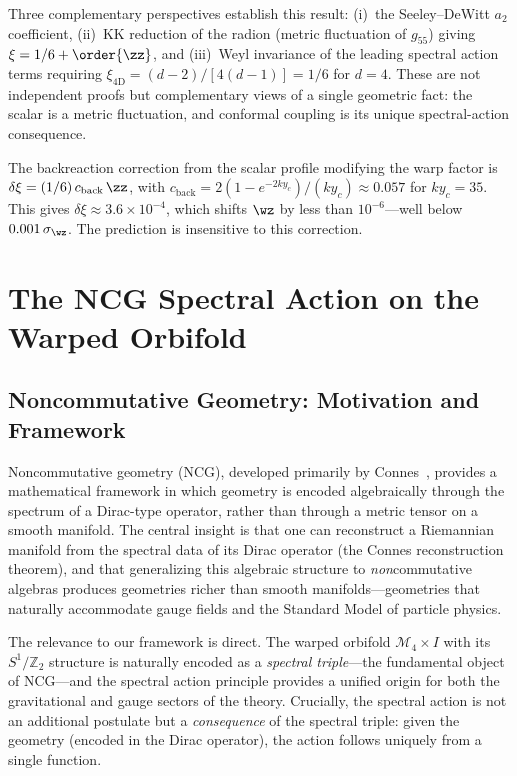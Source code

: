 Three complementary perspectives establish this result: (i)~the Seeley--DeWitt $a_2$ coefficient, (ii)~KK reduction of the radion (metric fluctuation of $g_{55}$) giving $\xi = 1/6 + \order{\zz}$, and (iii)~Weyl invariance of the leading spectral action terms requiring $\xi_{4\mathrm{D}} = (d-2)/[4(d-1)] = 1/6$ for $d = 4$. These are not independent proofs but complementary views of a single geometric fact: the scalar is a metric fluctuation, and conformal coupling is its unique spectral-action consequence.

The backreaction correction from the scalar profile modifying the warp factor is $\delta\xi = (1/6)\, c_{\mathrm{back}}\,\zz$, with $c_{\mathrm{back}} = 2(1 - e^{-2ky_c})/(ky_c) \approx 0.057$ for $ky_c = 35$. This gives $\delta\xi \approx 3.6 \times 10^{-4}$, which shifts $\wz$ by less than $10^{-6}$---well below $0.001\,\sigma_{\wz}$. The prediction is insensitive to this correction.


\section{The NCG Spectral Action on the Warped Orbifold}
\label{sec:1-ncg}

\subsection{Noncommutative Geometry: Motivation and Framework}
\label{sec:1-ncg-motivation}

Noncommutative geometry (NCG), developed primarily by Connes~\cite{ch1:connes94}, provides a mathematical framework in which geometry is encoded algebraically through the spectrum of a Dirac-type operator, rather than through a metric tensor on a smooth manifold. The central insight is that one can reconstruct a Riemannian manifold from the spectral data of its Dirac operator (the Connes reconstruction theorem), and that generalizing this algebraic structure to \emph{non}commutative algebras produces geometries richer than smooth manifolds---geometries that naturally accommodate gauge fields and the Standard Model of particle physics.

The relevance to our framework is direct. The warped orbifold $\mathcal{M}_4 \times I$ with its $S^1/\mathbb{Z}_2$ structure is naturally encoded as a \emph{spectral triple}---the fundamental object of NCG---and the spectral action principle provides a unified origin for both the gravitational and gauge sectors of the theory. Crucially, the spectral action is not an additional postulate but a \emph{consequence} of the spectral triple: given the geometry (encoded in the Dirac operator), the action follows uniquely from a single function.

